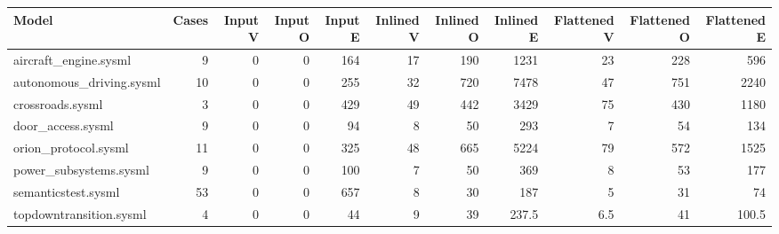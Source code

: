 \begin{tabular}{lrrrrrrrrrr}
\toprule
Model & Cases & Input V & Input O & Input E & Inlined V & Inlined O & Inlined E & Flattened V & Flattened O & Flattened E \\
\midrule
aircraft\_engine.sysml & 9 & 0 & 0 & 164 & 17 & 190 & 1231 & 23 & 228 & 596 \\
autonomous\_driving.sysml & 10 & 0 & 0 & 255 & 32 & 720 & 7478 & 47 & 751 & 2240 \\
crossroads.sysml & 3 & 0 & 0 & 429 & 49 & 442 & 3429 & 75 & 430 & 1180 \\
door\_access.sysml & 9 & 0 & 0 & 94 & 8 & 50 & 293 & 7 & 54 & 134 \\
orion\_protocol.sysml & 11 & 0 & 0 & 325 & 48 & 665 & 5224 & 79 & 572 & 1525 \\
power\_subsystems.sysml & 9 & 0 & 0 & 100 & 7 & 50 & 369 & 8 & 53 & 177 \\
semanticstest.sysml & 53 & 0 & 0 & 657 & 8 & 30 & 187 & 5 & 31 & 74 \\
topdowntransition.sysml & 4 & 0 & 0 & 44 & 9 & 39 & 237.5 & 6.5 & 41 & 100.5 \\
\bottomrule
\end{tabular}
